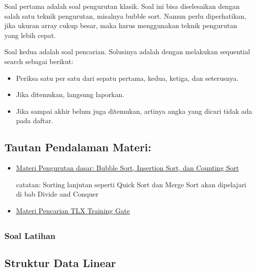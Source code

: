 \documentclass[]{article}
\providecommand{\tightlist}{%
  \setlength{\itemsep}{0pt}\setlength{\parskip}{0pt}}
\begin{document}
Soal pertama adalah soal pengurutan klasik. Soal ini bisa diselesaikan
dengan salah satu teknik pengurutan, misalnya bubble sort. Namun perlu
diperhatikan, jika ukuran array cukup besar, maka harus menggunakan
teknik pengurutan yang lebih cepat.

Soal kedua adalah soal pencarian. Solusinya adalah dengan melakukan
sequential search sebagai berikut:

\begin{itemize}
\tightlist
\item
  Periksa satu per satu dari sepatu pertama, kedua, ketiga, dan
  seterusnya.
\item
  Jika ditemukan, langsung laporkan.
\item
  Jika sampai akhir belum juga ditemukan, artinya angka yang dicari
  tidak ada pada daftar.
\end{itemize}

\subsection{Tautan Pendalaman Materi:}\label{tautan-pendalaman-materi}

\begin{itemize}
\item
  \href{https://training.ia-toki.org/training/curriculums/1/courses/1/chapters/16/lessons/13/}{Materi
  Pengurutan dasar: Bubble Sort, Insertion Sort, dan Counting Sort}

  catatan: Sorting lanjutan seperti Quick Sort dan Merge Sort akan
  dipelajari di bab Divide and Conquer
\item
  \href{https://training.ia-toki.org/training/curriculums/1/courses/1/chapters/15/lessons/12/}{Materi
  Pencarian TLX Training Gate}
\end{itemize}

\subsection{}\label{rekomandasi-soal-soal-latihan}

\subsubsection{Soal Latihan}\label{soal-latihan-4}

\subsection{Struktur Data Linear}\label{struktur-data-linear}
\end{document}
